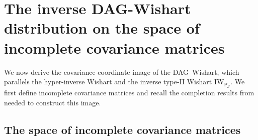 \documentclass[12pt]{article}
\newcommand{\G}{\mathcal{G}}
\newcommand{\Pg}{\mathrm{P}_{\G}}
\theoremstyle{plain}
\theoremstyle{definition}
\theoremstyle{remark}
\begin{document}
\section{The inverse DAG-Wishart distribution on the space of incomplete covariance matrices}\label{sec:Sd}
We now derive the covariance-coordinate image of the DAG--Wishart,
which parallels the hyper-inverse Wishart and the inverse type-II
Wishart \(\mathrm{IW}_{\Pg}\).  We first define incomplete covariance
matrices and recall the completion results from \cite{benraj12} needed
to construct this image.


\subsection{The space of incomplete covariance matrices}\label{sub:completion_in_pdd} 
\end{document}
